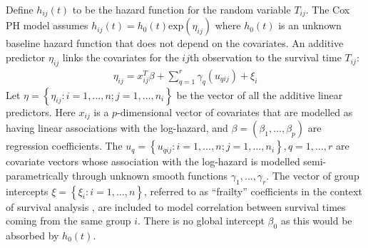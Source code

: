 \documentclass[AMA,STIX1COL,doublespace]{WileyNJD-v2}
\begin{document}
Define $h_{ij}(t)$ to be the hazard function for the random variable $T_{ij}$. The Cox PH model assumes $h_{ij}(t) = h_0(t)\text{exp}(\eta_{ij})$ where $h_0(t)$ is an unknown baseline hazard function that does not depend on the covariates. An additive predictor $\eta_{ij}$ links the covariates for the $ij$th observation to the survival time $T_{ij}$:
\begin{equation}\begin{aligned}\label{eqn:eta}
\eta_{ij} =x_{ij}^{T}\beta+\sum_{q=1}^{r} \gamma_q(u_{qij}) +\xi_{i}
\end{aligned}\end{equation}
Let $\eta = \left\{ \eta_{ij}: i = 1,\ldots,n; j = 1,\ldots,n_{i}\right\}$ be the vector of all the additive linear predictors. Here $x_{ij}$ is a $p$-dimensional vector of covariates that are modelled as having linear associations with the log-hazard, and $\beta = (\beta_{1},\ldots,\beta_{p})$ are regression coefficients. The $u_{q} = \left\{u_{qij}: i = 1,\ldots,n; j = 1,\ldots,n_{i} \right\}, q = 1,\ldots,r$ are covariate vectors whose association with the log-hazard is modelled semi-parametrically through unknown smooth functions $\gamma_1,\ldots,\gamma_r$. The vector of group intercepts $\xi = \left\{ \xi_{i}: i=1,\ldots,n\right\}$, referred to as ``frailty'' coefficients in the context of survival analysis \cite{frailty}, are included to model correlation between survival times coming from the same group $i$. There is no global intercept $\beta_{0}$ as this would be absorbed by $h_{0}(t)$.
\end{document}
